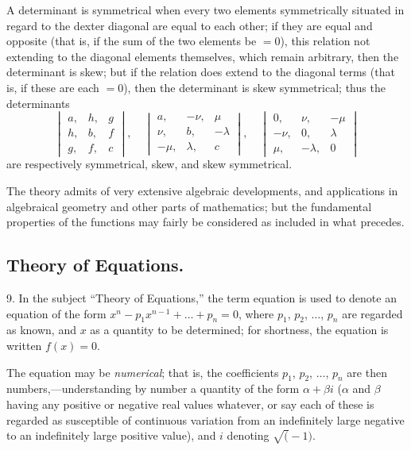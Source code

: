 \documentclass[12pt,a4paper,oneside]{book}
\begin{document}
A determinant is symmetrical when every two elements symmetrically situated in regard to the dexter diagonal are equal to each other; if they are equal and opposite (that is, if the sum of the two elements be $=0$), this relation not extending to the diagonal elements themselves, which remain arbitrary, then the determinant is skew; but if the relation does extend to the diagonal terms (that is, if these are each $=0$), then the determinant is skew symmetrical; thus the determinants
\[
\begin{vmatrix} a, & h, & g \\ h, & b, & f \\ g, & f, & c \end{vmatrix},\quad \begin{vmatrix} a, & -\nu, & \mu \\ \nu, & b, & -\lambda \\ -\mu, & \lambda, & c \end{vmatrix},\quad \begin{vmatrix} 0, & \nu, & -\mu \\ -\nu, & 0, & \lambda \\ \mu, & -\lambda, & 0 \end{vmatrix}
\]
are respectively symmetrical, skew, and skew symmetrical.

\newpage
The theory admits of very extensive algebraic developments, and applications in algebraical geometry and other parts of mathematics; but the fundamental properties of the functions may fairly be considered as included in what precedes.

\subsection*{Theory of Equations.}

9. In the subject ``Theory of Equations,'' the term equation is used to denote an equation of the form $x^{n}-p_{1}x^{n-1}+\dots+p_{n}=0$, where $p_{1}$, $p_{2}$, $\dots$, $p_{n}$ are regarded as known, and $x$ as a quantity to be determined; for shortness, the equation is written $f(x)=0$.

The equation may be \textit{numerical}; that is, the coefficients $p_{1}$, $p_{2}$, $\dots$, $p_{n}$ are then numbers,---understanding by number a quantity of the form $\alpha+\beta i$ ($\alpha$ and $\beta$ having any positive or negative real values whatever, or say each of these is regarded as susceptible of continuous variation from an indefinitely large negative to an indefinitely large positive value), and $i$ denoting $\surd(-1)$.
\end{document}
